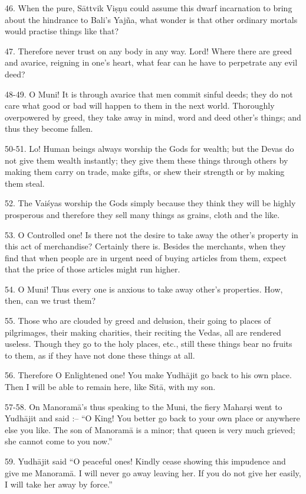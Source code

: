 46. When the pure, S\=attvik Vi\d{s}\d{n}u could assume this dwarf incarnation to bring about the hindrance to Bali's Yaj\~na, what wonder is that other ordinary mortals would practise things like that?

47. Therefore never trust on any body in any way. Lord! Where there are greed and avarice, reigning in one's heart, what fear can he have to perpetrate any evil deed?

48-49. O Muni! It is through avarice that men commit sinful deeds; they do not care what good or bad will happen to them in the next world. Thoroughly overpowered by greed, they take away in mind, word and deed other's things; and thus they become fallen.

50-51. Lo! Human beings always worship the Gods for wealth; but the Devas do not give them wealth instantly; they give them these things through others by making them carry on trade, make gifts, or shew their strength or by making them steal.

52. The Vai\'syas worship the Gods simply because they think they will be highly prosperous and therefore they sell many things as grains, cloth and the like.

53. O Controlled one! Is there not the desire to take away the other's property in this act of merchandise? Certainly there is. Besides the merchants, when they find that when people are in urgent need of buying articles from them, expect that the price of those articles might run higher.

54. O Muni! Thus every one is anxious to take away other's properties. How, then, can we trust them?

55. Those who are clouded by greed and delusion, their going to places of pilgrimages, their making charities, their reciting the Vedas, all are rendered useless. Though they go to the holy places, etc., still these things bear no fruits to them, as if they have not done these things at all.

56. Therefore O Enlightened one! You make Yudh\=ajit go back to his own place. Then I will be able to remain here, like S\={\i}t\=a, with my son.

57-58. On Manoram\=a's thus speaking to the Muni, the fiery Mahar\d{s}i went to Yudh\=ajit and said :-- ``O King! You better go back to your own place or anywhere else you like. The son of Manoram\=a is a minor; that queen is very much grieved; she cannot come to you now.''

59. Yudh\=ajit said ``O peaceful ones! Kindly cease showing this impudence and give me Manoram\=a. I will never go away leaving her. If you do not give her easily, I will take her away by force.''

